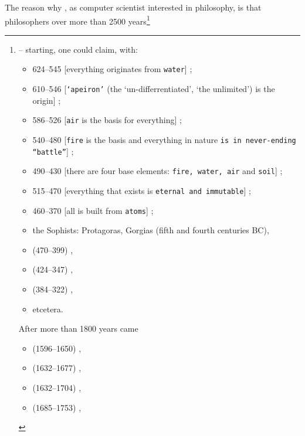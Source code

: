 \mnewfoil
      
\begynd
\pind The reason why , as computer scientist interested in philosophy,
\begynd
\pind is that philosophers over more than 2500
      years{\footnote{\LLLL -- \label{citations-1}
      starting, one could claim, with:\scriptsize\footnotesize
\begin{multicols}{2}
\begin{itemize}
\item {} 624--545 [everything originates from
      {\texttt{water}}] \cite{Thales:Dines};
\item {} 610--546 [{\texttt{`apeiron'}} (the
      `un\--dif\-fer\-ren\-ti\-a\-ted', `the unlimited') is the
      origin] \cite{Anaximander:Dines};
\item {} 586--526 [{\texttt{air}} is the basis for
      everything] \cite{Anaximenes:Dines};
\item  {} 540--480 [\texttt{fire} is the
      basis and everything in nature {\texttt{is in never-ending
          ``battle''}}]  \cite{Heraklit:Dines};
\item {} 490--430 [there are four base elements:
      {\texttt{fire, water, air}} and {\texttt{soil}}] \cite{Empedokles:Dines};
\item {} 515--470 [everything that exists is \texttt{eternal and
          immutable}] \cite{Parminedes:Dines};
\item {} 460--370 [all is built from {\texttt{atoms}}] \cite{Demokrit:Dines};
\item the Sophists: Protagoras, Gorgias (fifth and fourth centuries BC),
\item {} (470--399) \cite{Socrates:Dines},
\item {} (424--347) \cite{Plato:Dines},
\item {} (384--322) \cite{Aristotle:Dines-x},
\item etcetera.
\end{itemize}
\noindent
After  more than 1800 years came
\begin{itemize}
\item {} (1596--1650) \cite{Descartes:Dines},
\item {} (1632--1677) \cite{Spinoza:Dines},
\item {} (1632--1704) \cite{Locke:Dines},
\item {} (1685--1753) \cite{Berkeley:Dines},

\end{itemize}
\end{multicols}}}
